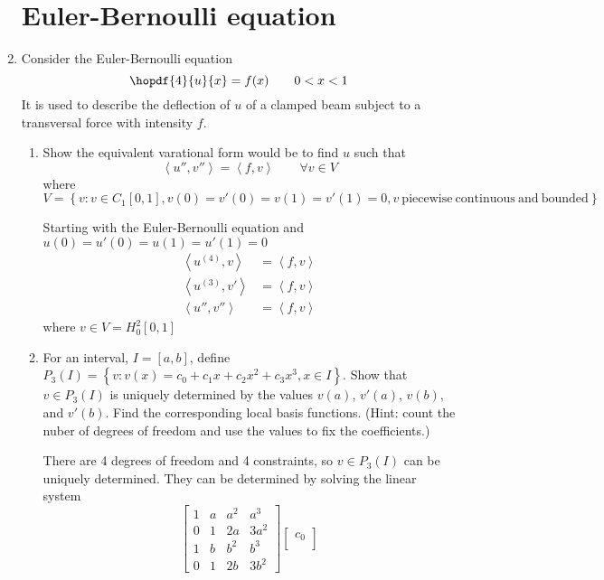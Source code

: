 \documentclass{article}
\newcommand\NoIndent[1]{%
  \begingroup
  \par
  \parshape0
  #1\par
  \endgroup
}
\begin{document}
\begin{enumerate}
\NoIndent{\section{Euler-Bernoulli equation}}

	\item Consider the Euler-Bernoulli equation
		\begin{equation*}
			\hopdf{4}{u}{x} = f(x) \qquad 0 < x < 1
		\end{equation*}
		It is used to describe the deflection of $u$ of a clamped beam
		subject to a transversal force with intensity $f$.
		\begin{enumerate}
			\item Show the equivalent varational form would be to find $u$ such that
				\begin{equation*}
					\left<u'',v''\right> = \left<f,v\right> \qquad \forall v \in V
				\end{equation*}
				where $V = \left\{v:v\in C_1[0,1],v(0)=v'(0)=v(1)=v'(1)=0,
					v\mathrm{\ piecewise\ continuous\ and\ bounded}\right\}$
\NoIndent{
	Starting with the Euler-Bernoulli equation and $u(0)=u'(0)=u(1)=u'(1)=0$
	\begin{align*}
		\left<u^{(4)},v\right> &= \left<f,v\right> \\
		\left<u^{(3)},v'\right> &= \left<f,v\right> \\
		\left<u'',v''\right> &= \left<f,v\right>
	\end{align*}
	where $v \in V = H_0^2[0,1]$
}
			\item For an interval, $I = [a,b]$, define $P_3(I) =
				\left\{v:v(x) = c_0 + c_1 x + c_2 x^2 + c_3 x^3, x \in I\right\}$.
				Show that $v \in P_3(I)$ is uniquely determined by the values
				$v(a)$, $v'(a)$, $v(b)$, and $v'(b)$.
				Find the corresponding local basis functions.
				(Hint: count the nuber of degrees of freedom and use the values to fix the coefficients.)
\NoIndent{
	There are 4 degrees of freedom and 4 constraints, so $v \in P_3(I)$ can be uniquely determined.
	They can be determined by solving the linear system
	\begin{equation*}
		\begin{bmatrix}
			1 & a & a^2 & a^3 \\
			0 & 1 & 2a & 3a^2 \\
			1 & b & b^2 & b^3 \\
			0 & 1 & 2b & 3b^2
		\end{bmatrix}
		\begin{bmatrix}
			c_0 \\

\end{bmatrix}
\end{equation*}}
\end{enumerate}
\end{enumerate}
\end{document}
